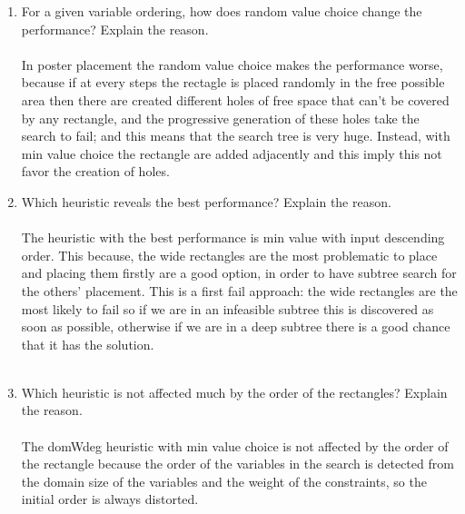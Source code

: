 \documentclass{article}
\begin{document}
    \begin{enumerate}
    \item For a given variable ordering, how does random value choice change the performance? Explain the reason. \\ \\
In poster placement the random value choice makes the performance worse, because if at every steps the rectagle is placed randomly in the free possible area then there are created different holes of free space that can’t be covered by any rectangle, and the progressive generation of these holes take the search to fail; and this means that the search tree is very huge. Instead, with min value choice the rectangle are added adjacently and this imply this not favor the creation of holes.\\
    \item Which heuristic reveals the best performance? Explain the reason. \\ \\
    The heuristic with the best performance is min value with input descending order. This because, the wide rectangles are the most problematic to place and placing them firstly are a good option, in order to have subtree search for the others' placement. This is a first fail approach: the wide rectangles are the most likely to fail so if we are in an infeasible subtree this is discovered as soon as possible, otherwise if we are in a deep subtree there is a good chance that it has the solution. \\ \\
    \item Which heuristic is not affected much by the order of the rectangles? Explain the reason. \\ \\
    The domWdeg heuristic with min value choice is not affected by the order of the rectangle because the order of the variables in the search is detected from the domain size of the variables and the weight of the constraints, so the initial order is always distorted.\\   
    \end{enumerate}
\end{document}
